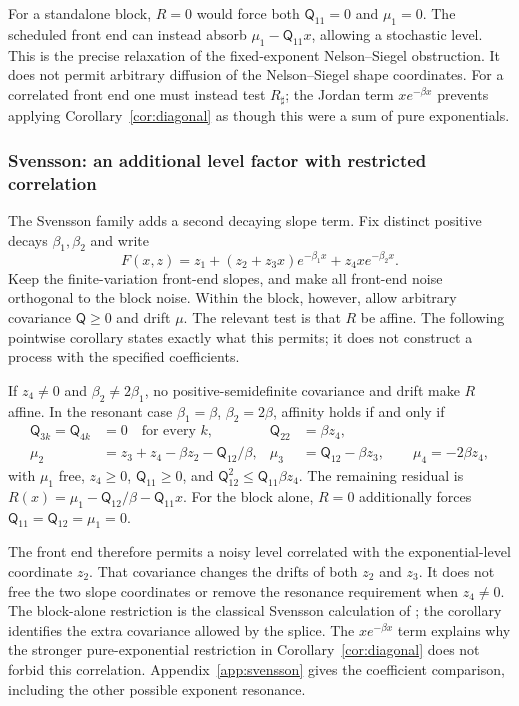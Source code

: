For a standalone block, $R=0$ would force both $\mathsf Q_{11}=0$ and $\mu_1=0$. The scheduled front end can instead absorb $\mu_1-\mathsf Q_{11}x$, allowing a stochastic level. This is the precise relaxation of the fixed-exponent Nelson--Siegel obstruction. It does not permit arbitrary diffusion of the Nelson--Siegel shape coordinates. For a correlated front end one must instead test $R_\sharp$; the Jordan term $xe^{-\beta x}$ prevents applying Corollary~\ref{cor:diagonal} as though this were a sum of pure exponentials.

\subsubsection{Svensson: an additional level factor with restricted correlation}\label{sec:svensson}
The Svensson family adds a second decaying slope term. Fix distinct positive decays $\beta_1,\beta_2$ and write
\[
F(x,z)=z_1+(z_2+z_3x)e^{-\beta_1x}+z_4xe^{-\beta_2x}.
\]
Keep the finite-variation front-end slopes, and make all front-end noise orthogonal to the block noise. Within the block, however, allow arbitrary covariance $\mathsf Q\ge0$ and drift $\mu$. The relevant test is that $R$ be affine. The following pointwise corollary states exactly what this permits; it does not construct a process with the specified coefficients.

\begin{corollary}\label{cor:svensson}
If $z_4\ne0$ and $\beta_2\ne2\beta_1$, no positive-semidefinite covariance and drift make $R$ affine. In the resonant case $\beta_1=\beta$, $\beta_2=2\beta$, affinity holds if and only if
\begin{align}
\mathsf Q_{3k}=\mathsf Q_{4k}&=0\quad\text{for every }k,&
\mathsf Q_{22}&=\beta z_4,\label{eq:svenssoncov}\\
\mu_2&=z_3+z_4-\beta z_2-\mathsf Q_{12}/\beta,&
\mu_3&=\mathsf Q_{12}-\beta z_3,\qquad
\mu_4=-2\beta z_4,\nonumber
\end{align}
with $\mu_1$ free, $z_4\ge0$, $\mathsf Q_{11}\ge0$, and
$\mathsf Q_{12}^2\le\mathsf Q_{11}\beta z_4$.
The remaining residual is
$R(x)=\mu_1-\mathsf Q_{12}/\beta-\mathsf Q_{11}x$.
For the block alone, $R=0$ additionally forces
$\mathsf Q_{11}=\mathsf Q_{12}=\mu_1=0$.
\end{corollary}

The front end therefore permits a noisy level correlated with the exponential-level coordinate $z_2$. That covariance changes the drifts of both $z_2$ and $z_3$. It does not free the two slope coordinates or remove the resonance requirement when $z_4\ne0$. The block-alone restriction is the classical Svensson calculation of \citet{filipovic2000exponential}; the corollary identifies the extra covariance allowed by the splice. The $xe^{-\beta x}$ term explains why the stronger pure-exponential restriction in Corollary~\ref{cor:diagonal} does not forbid this correlation. Appendix~\ref{app:svensson} gives the coefficient comparison, including the other possible exponent resonance.
